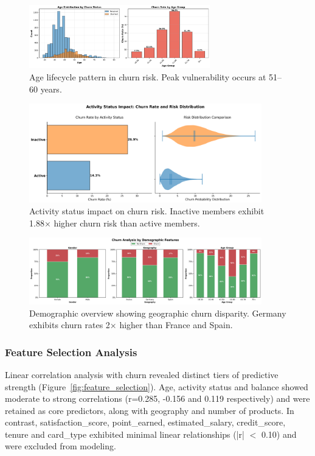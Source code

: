 \documentclass[12pt]{article}
\begin{document}
\begin{figure}[H]
\centering
\includegraphics[width=0.7\textwidth]{img/03_age_distribution_churn.png}
\caption{Age lifecycle pattern in churn risk. Peak vulnerability occurs at 51–60 years.}
\label{fig:age}
\end{figure}

\begin{figure}[H]
\centering
\includegraphics[width=0.9\textwidth]{img/08_churn_rate_violin_hybridv2.png}
\caption{Activity status impact on churn risk. Inactive members exhibit 1.88× higher churn risk than active members.}
\label{fig:active}
\end{figure}

\begin{figure}[H]
\centering
\includegraphics[width=0.9\textwidth]{img/02_demographic_overview.png}
\caption{Demographic overview showing geographic churn disparity. Germany exhibits churn rates 2× higher than France and Spain.}
\label{fig:geography}
\end{figure}

\subsubsection{Feature Selection Analysis}
Linear correlation analysis with churn revealed distinct tiers of predictive strength (Figure~\ref{fig:feature_selection}). Age, activity status and balance showed moderate to strong correlations (r=0.285, -0.156 and 0.119 respectively) and were retained as core predictors, along with geography and number of products. In contrast, satisfaction\_score, point\_earned, estimated\_salary, credit\_score, tenure and card\_type exhibited minimal linear relationships (|r| $<$ 0.10) and were excluded from modeling.
\end{document}
